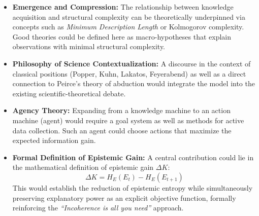 \documentclass[11pt, a4paper]{article}
\begin{document}
\begin{itemize}
		\item \textbf{Emergence and Compression:} The relationship between knowledge acquisition and structural complexity can be theoretically underpinned via concepts such as \textit{Minimum Description Length} or Kolmogorov complexity. Good theories could be defined here as macro-hypotheses that explain observations with minimal structural complexity.
		
		\item \textbf{Philosophy of Science Contextualization:} A discourse in the context of classical positions (Popper, Kuhn, Lakatos, Feyerabend) as well as a direct connection to Peirce's theory of abduction would integrate the model into the existing scientific-theoretical debate.
		
		\item \textbf{Agency Theory:} Expanding from a knowledge machine to an action machine (agent) would require a goal system as well as methods for active data collection. Such an agent could choose actions that maximize the expected information gain.
		
		\item \textbf{Formal Definition of Epistemic Gain:} A central contribution could lie in the mathematical definition of epistemic gain $\Delta K$:
		\begin{equation}
			\Delta K = H_E(E_t) - H_E(E_{t+1})
		\end{equation}
		This would establish the reduction of epistemic entropy while simultaneously preserving explanatory power as an explicit objective function, formally reinforcing the \textit{``Incoherence is all you need''} approach.
	\end{itemize}
\newpage
\end{document}
